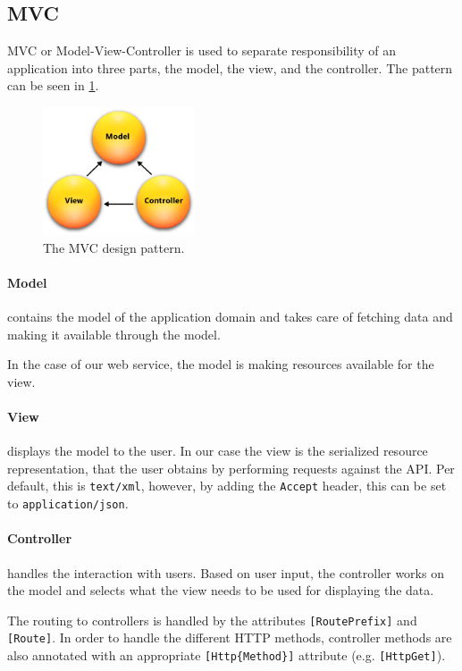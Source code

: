 \subsection{MVC} 
MVC or Model-View-Controller\cite{aspmvc} is used to separate responsibility of an application into three parts, the model, the view, and the controller.
The pattern can be seen in \cref{mvcdiagram}.

\begin{figure}[h]
\center
\includegraphics[width=0.4\textwidth]{graphics/mvc}
\caption{The MVC design pattern.\cite{aspmvc}}
\label{mvcdiagram}
\end{figure}

\paragraph{Model} contains the model of the application domain and takes care of fetching data and making it available through the model.

In the case of our web service, the model is making resources available for the view.

\paragraph{View} displays the model to the user.
In our case the view is the serialized resource representation, that the user obtains by performing requests against the API.
Per default, this is \texttt{text/xml}, however, by adding the \texttt{Accept} header, this can be set to \texttt{application/json}.\cite[Section 14]{http_specification}

\paragraph{Controller} handles the interaction with users.
Based on user input, the controller works on the model and selects what the view needs to be used for displaying the data.

The routing to controllers is handled by the attributes \texttt{[RoutePrefix]} and \texttt{[Route]}.
In order to handle the different HTTP methods, controller methods are also annotated with an appropriate \texttt{[Http\{Method\}]} attribute (e.g. \texttt{[HttpGet]}).\cite{asp_routing}